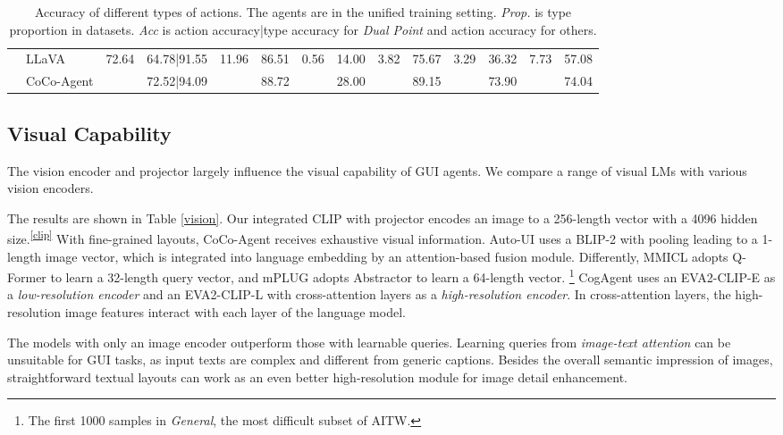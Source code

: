 \begin{table*}[htb]
\begin{tabular}{p{1.4cm}p{1.7cm}p{0.5cm}p{1.3cm}p{0.4cm}p{0.4cm}p{0.4cm}p{0.4cm}p{0.3cm}p{0.4cm}p{0.3cm}p{0.4cm}p{0.4cm}p{0.5cm}}
            \hdashline
            \multirow{2}{*}{WebShop.} & LLaVA  & \multirow{2}{*}{72.64} & 64.78|91.55 &\multirow{2}{*}{11.96} & 86.51 & \multirow{2}{*}{0.56}&14.00 & \multirow{2}{*}{3.82}& 75.67 & \multirow{2}{*}{3.29} & 36.32 & \multirow{2}{*}{7.73}& 57.08 \\
            & CoCo-Agent & &72.52|94.09 & & 88.72 & & 28.00 & & 89.15 & & 73.90 & & 74.04 \\
		\bottomrule
	\end{tabular}
        \caption{Accuracy of different types of actions. The agents are in the unified training setting. \textit{Prop.} is type proportion in datasets. \textit{Acc} is action accuracy|type accuracy for \textit{Dual Point} and action accuracy for others. }
	\label{difftype}
\end{table*}
\subsection{Visual Capability}
\label{52}
The vision encoder and projector largely influence the visual capability of GUI agents.
We compare a range of visual LMs with various vision encoders.

The results are shown in Table \ref{vision}. Our integrated CLIP with projector encodes an image to a 256-length vector with a 4096 hidden size.\textsuperscript{\ref{clip}}
With fine-grained layouts, CoCo-Agent receives exhaustive visual information.
Auto-UI uses a BLIP-2 with pooling leading to a 1-length image vector, which is integrated into language embedding by an attention-based fusion module.
Differently, MMICL adopts Q-Former to learn a 32-length query vector, and mPLUG adopts Abstractor to learn a 64-length vector. \footnote{The first 1000 samples in \textit{General}, the most difficult subset of AITW.\label{pre1k}} 
CogAgent uses an EVA2-CLIP-E \cite{sun2023eva} as a \textit{low-resolution encoder} and an EVA2-CLIP-L \cite{sun2023eva} with cross-attention layers as a \textit{high-resolution encoder}. In cross-attention layers, the high-resolution image features interact with each layer of the language model.

The models with only an image encoder outperform those with learnable queries.
Learning queries from \textit{image-text attention} can be unsuitable for GUI tasks, as input texts are complex and different from generic captions. 
Besides the overall semantic impression of images, straightforward textual layouts can work as an even better high-resolution module for image detail enhancement.

